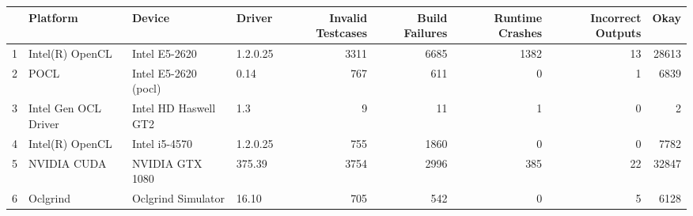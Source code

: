 \begin{tabular}{llllrrrrr}
\toprule
{} &              Platform &                Device &    Driver &  Invalid Testcases &  Build Failures &  Runtime Crashes &  Incorrect Outputs &   Okay \\
\midrule
1 &       Intel(R) OpenCL &         Intel E5-2620 &  1.2.0.25 &               3311 &            6685 &             1382 &                 13 &  28613 \\
2 &                  POCL &  Intel E5-2620 (pocl) &      0.14 &                767 &             611 &                0 &                  1 &   6839 \\
3 &  Intel Gen OCL Driver &  Intel HD Haswell GT2 &       1.3 &                  9 &              11 &                1 &                  0 &      2 \\
4 &       Intel(R) OpenCL &         Intel i5-4570 &  1.2.0.25 &                755 &            1860 &                0 &                  0 &   7782 \\
5 &           NVIDIA CUDA &       NVIDIA GTX 1080 &    375.39 &               3754 &            2996 &              385 &                 22 &  32847 \\
6 &              Oclgrind &    Oclgrind Simulator &     16.10 &                705 &             542 &                0 &                  5 &   6128 \\
\bottomrule
\end{tabular}
